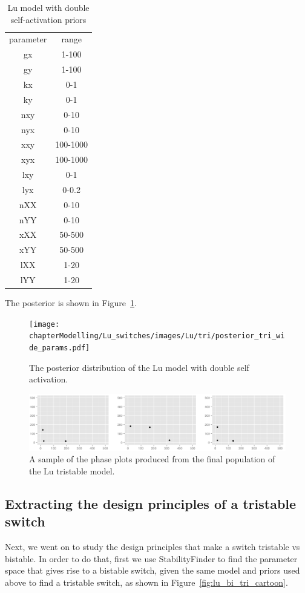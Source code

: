 \begin{table}[htbp]
\centering
\caption{Lu model with double self-activation priors}
\label{tab:lu_dp_pr}
\begin{tabular}{cc}
parameter & range \\
gx & 1-100 \\
gy & 1-100 \\
kx & 0-1 \\
ky & 0-1 \\
nxy & 0-10 \\
nyx & 0-10 \\
xxy & 100-1000 \\
xyx & 100-1000 \\
lxy & 0-1 \\
lyx & 0-0.2 \\
nXX & 0-10  \\
nYY & 0-10 \\
xXX & 50-500 \\
xYY & 50-500 \\
lXX & 1-20 \\
lYY & 1-20
\end{tabular}
\end{table}

The posterior is shown in Figure~\ref{fig:lu_tristable}. 
\begin{figure}[h]
\centering
\texttt{[image: chapterModelling/Lu\_switches/images/Lu/tri/posterior\_tri\_wide\_params.pdf]}
\caption[The posterior distribution of the Lu model with double self activation]{The posterior distribution of the Lu model with double self activation.}
\label{fig:lu_tristable}
\end{figure}


\begin{figure}[h]
\centering
\includegraphics[scale=0.3]{chapterModelling/Lu_switches/images/Lu/tri/phase_plots.png}
\caption{A sample of the phase plots produced from the final population of the Lu tristable model.}
\label{fig:lu_tri_phase_pl}
\end{figure}
\clearpage
\subsection{Extracting the design principles of a tristable switch}
Next, we went on to study the design principles that make a switch tristable vs bistable. In order to do that, first we use StabilityFinder to find the parameter space that gives rise to a bistable switch, given the same model and priors used above to find a tristable switch, as shown in Figure~\ref{fig:lu_bi_tri_cartoon}.

